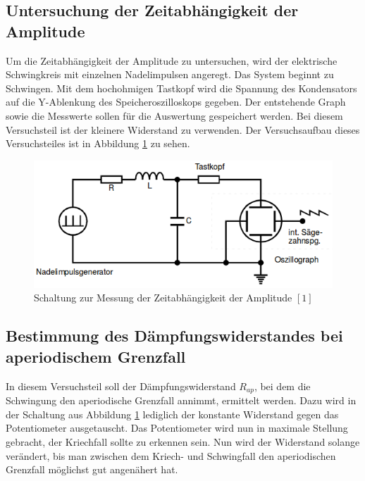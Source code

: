 \documentclass[11pt,ngerman,a4paper]{article}
\begin{document}
\subsection{Untersuchung der Zeitabhängigkeit der Amplitude}
Um die Zeitabhängigkeit der Amplitude zu untersuchen, wird der elektrische Schwingkreis mit einzelnen Nadelimpulsen angeregt. Das System beginnt zu Schwingen. Mit dem hochohmigen Tastkopf wird die Spannung des Kondensators auf die Y-Ablenkung des Speicheroszilloskops gegeben. Der entstehende Graph sowie die Messwerte sollen für die Auswertung gespeichert werden. Bei diesem Versuchsteil ist der kleinere Widerstand zu verwenden. Der Versuchsaufbau dieses Versuchsteiles ist in Abbildung \ref{S1} zu sehen.
\begin{figure}[h]
\centering
\includegraphics[scale=0.7]{Aufbau1.png}
\caption{Schaltung zur Messung der Zeitabhängigkeit der Amplitude $[1]$}
\label{S1}
\end{figure}
\subsection{Bestimmung des Dämpfungswiderstandes bei aperiodischem Grenzfall}
In diesem Versuchsteil soll der Dämpfungswiderstand $R_{ap}$, bei dem die Schwingung den aperiodische Grenzfall annimmt, ermittelt werden. Dazu wird in der Schaltung aus Abbildung \ref{S1} lediglich der konstante Widerstand gegen das Potentiometer ausgetauscht. Das Potentiometer wird nun in maximale Stellung gebracht, der Kriechfall sollte zu erkennen sein. Nun wird der Widerstand solange verändert, bis man zwischen dem Kriech- und Schwingfall den aperiodischen Grenzfall möglichst gut angenähert hat.
\end{document}
